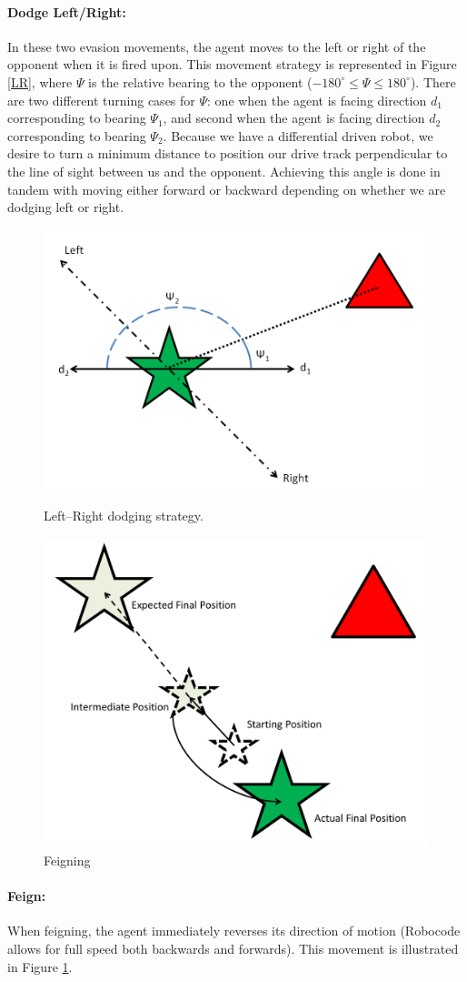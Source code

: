 \documentclass{article}
\theoremstyle{plain}
\theoremstyle{definition}
\theoremstyle{remark}
\begin{document}
\paragraph{Dodge Left/Right:}
In these two evasion movements, the agent moves to the left or right of the opponent when it is fired upon. This movement strategy is represented in Figure \ref{LR}, where $\Psi$ is the relative bearing to the opponent ($-180^{\circ} \leq \Psi \leq 180^{\circ}$). There are two different turning cases for $\Psi$: one when the agent is facing direction $d_1$ corresponding to bearing $\Psi_1$, and second when the agent is facing direction $d_2$ corresponding to bearing $\Psi_2$. Because we have a differential driven robot, we desire to turn a minimum distance to position our drive track perpendicular to the line of sight between us and the opponent. Achieving this angle is done in tandem with moving either forward or backward depending on whether we are dodging left or right.

\begin{figure}[t]
\begin{minipage}[b]{0.5\linewidth}
	\centering
		\includegraphics[width=6 cm]{LR}
	\caption{Left--Right dodging strategy.}
	\label{LR}
\end{minipage}
\hspace{0.5cm}
\begin{minipage}[b]{0.5\linewidth}
	\centering
		\includegraphics[width=6 cm]{Feign.png}
	\caption{Feigning}
	\label{feign}
\end{minipage}
\end{figure}

\paragraph{Feign:}
When feigning, the agent immediately reverses its direction of motion (Robocode allows for full speed both backwards and forwards). This movement is illustrated in Figure \ref{feign}.
\end{document}
